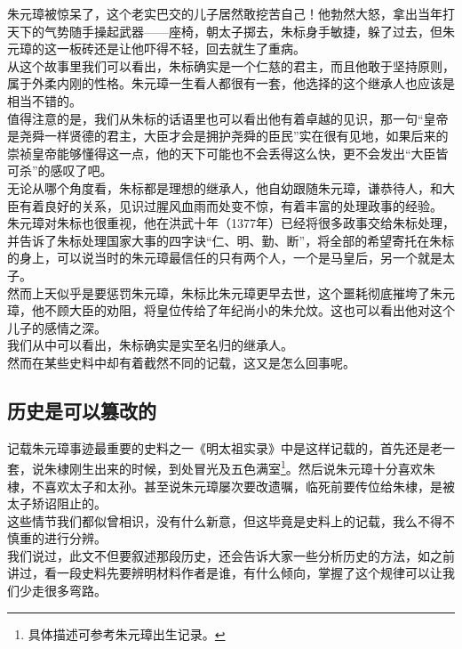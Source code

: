 \begin{multicols}{\theparacolNo}
朱元璋被惊呆了，这个老实巴交的儿子居然敢挖苦自己！他勃然大怒，拿出当年打天下的气势随手操起武器——座椅，朝太子掷去，朱标身手敏捷，躲了过去，但朱元璋的这一板砖还是让他吓得不轻，回去就生了重病。\\

从这个故事里我们可以看出，朱标确实是一个仁慈的君主，而且他敢于坚持原则，属于外柔内刚的性格。朱元璋一生看人都很有一套，他选择的这个继承人也应该是相当不错的。\\

值得注意的是，我们从朱标的话语里也可以看出他有着卓越的见识，那一句“皇帝是尧舜一样贤德的君主，大臣才会是拥护尧舜的臣民”实在很有见地，如果后来的崇祯皇帝能够懂得这一点，他的天下可能也不会丢得这么快，更不会发出“大臣皆可杀”的感叹了吧。\\

无论从哪个角度看，朱标都是理想的继承人，他自幼跟随朱元璋，谦恭待人，和大臣有着良好的关系，见识过腥风血雨而处变不惊，有着丰富的处理政事的经验。\\

朱元璋对朱标也很重视，他在洪武十年（1377年）已经将很多政事交给朱标处理，并告诉了朱标处理国家大事的四字诀“仁、明、勤、断”，将全部的希望寄托在朱标的身上，可以说当时的朱元璋最信任的只有两个人，一个是马皇后，另一个就是太子。\\

然而上天似乎是要惩罚朱元璋，朱标比朱元璋更早去世，这个噩耗彻底摧垮了朱元璋，他不顾大臣的劝阻，将皇位传给了年纪尚小的朱允炆。这也可以看出他对这个儿子的感情之深。\\

我们从中可以看出，朱标确实是实至名归的继承人。\\

然而在某些史料中却有着截然不同的记载，这又是怎么回事呢。\\

\subsection{历史是可以篡改的}
记载朱元璋事迹最重要的史料之一《明太祖实录》中是这样记载的，首先还是老一套，说朱棣刚生出来的时候，到处冒光及五色满室\footnote{具体描述可参考朱元璋出生记录。}。然后说朱元璋十分喜欢朱棣，不喜欢太子和太孙。甚至说朱元璋屡次要改遗嘱，临死前要传位给朱棣，是被太子矫诏阻止的。\\

这些情节我们都似曾相识，没有什么新意，但这毕竟是史料上的记载，我么不得不慎重的进行分辨。\\

我们说过，此文不但要叙述那段历史，还会告诉大家一些分析历史的方法，如之前讲过，看一段史料先要辨明材料作者是谁，有什么倾向，掌握了这个规律可以让我们少走很多弯路。\\


\end{multicols}

